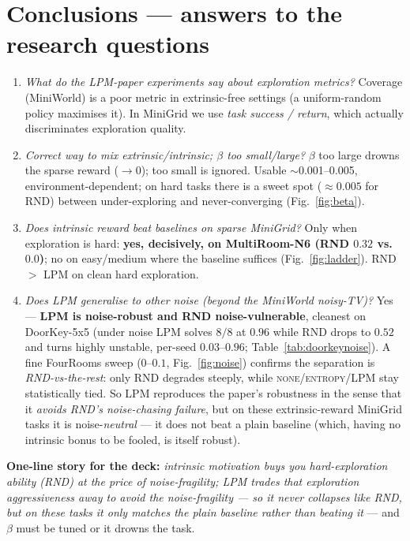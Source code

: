 \documentclass[11pt]{article}
\begin{document}
\section{Conclusions --- answers to the research questions}
\begin{enumerate}[leftmargin=2em]
\item[\textbf{RQ1}] \emph{What do the LPM-paper experiments say about exploration metrics?}
Coverage (MiniWorld) is a poor metric in extrinsic-free settings (a uniform-random policy maximises
it). In MiniGrid we use \emph{task success / return}, which actually discriminates exploration quality.
\item[\textbf{RQ2}] \emph{Correct way to mix extrinsic/intrinsic; $\beta$ too small/large?}
$\beta$ too large drowns the sparse reward ($\to 0$); too small is ignored. Usable $\sim$0.001--0.005,
environment-dependent; on hard tasks there is a sweet spot ($\approx0.005$ for RND) between
under-exploring and never-converging (Fig.~\ref{fig:beta}).
\item[\textbf{RQ3}] \emph{Does intrinsic reward beat baselines on sparse MiniGrid?}
Only when exploration is hard: \textbf{yes, decisively, on MultiRoom-N6 (RND $0.32$ vs.\ $0.0$)}; no on
easy/medium where the baseline suffices (Fig.~\ref{fig:ladder}). RND $>$ LPM on clean hard exploration.
\item[\textbf{RQ4}] \emph{Does LPM generalise to other noise (beyond the MiniWorld noisy-TV)?}
Yes --- \textbf{LPM is noise-robust and RND noise-vulnerable}, cleanest on DoorKey-5x5 (under noise LPM
solves $8/8$ at $0.96$ while RND drops to $0.52$ and turns highly unstable, per-seed $0.03$--$0.96$;
Table~\ref{tab:doorkeynoise}). A fine FourRooms sweep ($0$--$0.1$, Fig.~\ref{fig:noise}) confirms
the separation is \emph{RND-vs-the-rest}: only RND degrades steeply, while
\textsc{none}/\textsc{entropy}/LPM stay statistically tied. So LPM reproduces the paper's robustness in
the sense that it \emph{avoids RND's noise-chasing failure}, but on these extrinsic-reward MiniGrid
tasks it is noise-\emph{neutral} --- it does not beat a plain baseline (which, having no intrinsic bonus
to be fooled, is itself robust).
\end{enumerate}

\noindent\textbf{One-line story for the deck:} \emph{intrinsic motivation buys you hard-exploration
ability (RND) at the price of noise-fragility; LPM trades that exploration aggressiveness away to avoid
the noise-fragility --- so it never collapses like RND, but on these tasks it only matches the plain
baseline rather than beating it} --- and $\beta$ must be tuned or it drowns the task.
\end{document}
